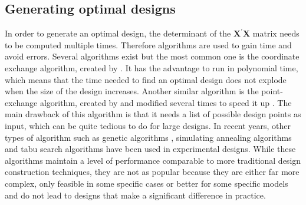 \subsection{Generating optimal designs}
In order to generate an optimal design, the determinant of the $\mathbf{X}^{\prime}\mathbf{X}$ matrix needs to be computed multiple times. Therefore algorithms are used to gain time and avoid errors. Several algorithms exist but the most common one is the coordinate exchange algorithm, created by \textcite{meyer1995coordinate}. It has the advantage to run in polynomial time, which means that the time needed to find an optimal design does not explode when the size of the design increases. Another similar algorithm is the point-exchange algorithm, created by \textcite{fedorov2013theory} and modified several times to speed it up \parencite{johnson1983some,atkinson1989construction}. The main drawback of this algorithm is that it needs a list of possible design points as input, which can be quite tedious to do for large designs. In recent years, other types of algorithm such as genetic algorithms \parencite{heredia2003genetic,heredia2004model}, simulating annealing algorithms \parencite{bohachevsky1986generalized,meyer1988constructing} and tabu search algorithms \parencite{jung1996construction} have been used in experimental designs. While these algorithms maintain a level of performance comparable to more traditional design construction techniques, they are not as popular because they are either far more complex, only feasible in some specific cases or better for some specific models and do not lead to designs that make a significant difference in practice.


